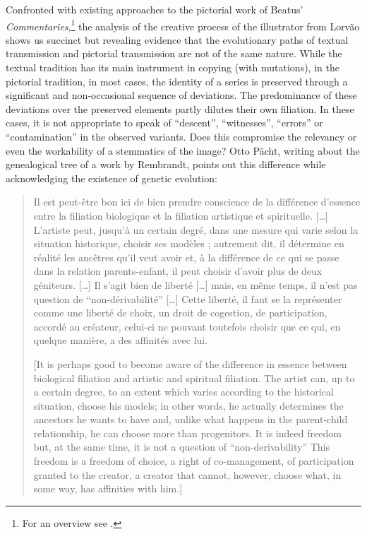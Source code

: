 \documentclass{article}
\begin{document}
Confronted with existing approaches to the pictorial work of Beatus'
\emph{Commentaries},\footnote{For an overview see \citealp[Vol. I, chap. 3, 31--102]{williams_illustrated_1994}.} the analysis of the creative process of the
illustrator from Lorvão shows us succinct but revealing evidence that
the evolutionary paths of textual transmission and pictorial
transmission are not of the same nature. While the textual tradition has
its main instrument in copying (with mutations), in the pictorial
tradition, in most cases, the identity of a series is preserved through
a significant and non-occasional sequence of deviations. The
predominance of these deviations over the preserved elements partly
dilutes their own filiation. In these cases, it is not appropriate to
speak of ``descent'', ``witnesses'', ``errors'' or ``contamination'' in
the observed variants. Does this compromise the relevancy or even the
workability of a stemmatics of the image? Otto Pächt, writing about the
genealogical tree of a work by Rembrandt, points out this difference
while acknowledging the existence of genetic evolution:

\begin{quote}
Il est peut-être bon ici de bien prendre conscience de la différence
d'essence entre la filiation biologique et la filiation artistique et
spirituelle. [\ldots] L'artiste peut, jusqu'à un certain degré, dans une
mesure qui varie selon la situation historique, choisir ses modèles ;
autrement dit, il détermine en réalité les ancêtres qu'il veut avoir et,
à la différence de ce qui se passe dans la relation parents-enfant, il
peut choisir d'avoir plus de deux géniteurs. [\ldots] Il s'agit bien de
liberté [\ldots] mais, en même temps, il n'est pas question de
``non-dérivabilité'' [\ldots] Cette liberté, il faut se la représenter
comme une liberté de choix, un droit de cogestion, de participation,
accordé au créateur, celui-ci ne pouvant toutefois choisir que ce qui,
en quelque manière, a des affinités avec lui.

\vspace{2em}

{[}It is perhaps good to become aware of the difference in essence
between biological filiation and artistic and spiritual filiation. The artist can, up to a certain degree, to an extent which
varies according to the historical situation, choose his models; in
other words, he actually determines the ancestors he wants to have and,
unlike what happens in the parent-child relationship, he can choose more than progenitors. It is indeed freedom but, at the same
time, it is not a question of ``non-derivability'' This freedom is a
freedom of choice, a right of co-management, of participation granted to the creator, a creator that cannot, however, choose what, in some way, has affinities with him.{]}
\begin{flushright}
    \parencite[135]{pacht_questions_1994}
\end{flushright}
\end{quote}
\end{document}
